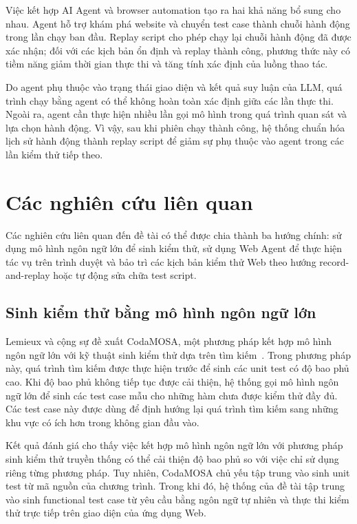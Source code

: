 Việc kết hợp AI Agent và browser automation tạo ra hai khả năng bổ sung cho nhau. Agent hỗ trợ khám phá website và chuyển test case thành chuỗi hành động trong lần chạy ban đầu. Replay script cho phép chạy lại chuỗi hành động đã được xác nhận; đối với các kịch bản ổn định và replay thành công, phương thức này có tiềm năng giảm thời gian thực thi và tăng tính xác định của luồng thao tác.

Do agent phụ thuộc vào trạng thái giao diện và kết quả suy luận của LLM, quá trình chạy bằng agent có thể không hoàn toàn xác định giữa các lần thực thi. Ngoài ra, agent cần thực hiện nhiều lần gọi mô hình trong quá trình quan sát và lựa chọn hành động. Vì vậy, sau khi phiên chạy thành công, hệ thống chuẩn hóa lịch sử hành động thành replay script để giảm sự phụ thuộc vào agent trong các lần kiểm thử tiếp theo.

\section{Các nghiên cứu liên quan}

Các nghiên cứu liên quan đến đề tài có thể được chia thành ba hướng chính: sử dụng mô hình ngôn ngữ lớn để sinh kiểm thử, sử dụng Web Agent để thực hiện tác vụ trên trình duyệt và bảo trì các kịch bản kiểm thử Web theo hướng record-and-replay hoặc tự động sửa chữa test script.

\subsection{Sinh kiểm thử bằng mô hình ngôn ngữ lớn}

Lemieux và cộng sự đề xuất CodaMOSA, một phương pháp kết hợp mô hình ngôn ngữ lớn với kỹ thuật sinh kiểm thử dựa trên tìm kiếm~\cite{10172800}. Trong phương pháp này, quá trình tìm kiếm được thực hiện trước để sinh các unit test có độ bao phủ cao. Khi độ bao phủ không tiếp tục được cải thiện, hệ thống gọi mô hình ngôn ngữ lớn để sinh các test case mẫu cho những hàm chưa được kiểm thử đầy đủ. Các test case này được dùng để định hướng lại quá trình tìm kiếm sang những khu vực có ích hơn trong không gian đầu vào.

Kết quả đánh giá cho thấy việc kết hợp mô hình ngôn ngữ lớn với phương pháp sinh kiểm thử truyền thống có thể cải thiện độ bao phủ so với việc chỉ sử dụng riêng từng phương pháp. Tuy nhiên, CodaMOSA chủ yếu tập trung vào sinh unit test từ mã nguồn của chương trình. Trong khi đó, hệ thống của đề tài tập trung vào sinh functional test case từ yêu cầu bằng ngôn ngữ tự nhiên và thực thi kiểm thử trực tiếp trên giao diện của ứng dụng Web.

